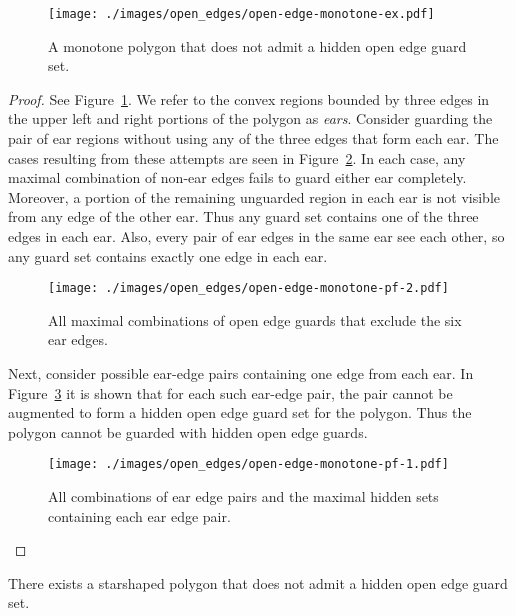 \documentclass{cccg12}
\begin{document}
\begin{figure}[ht]
\centering
\texttt{[image: ./images/open\_edges/open-edge-monotone-ex.pdf]}
\caption{A monotone polygon that does not admit a hidden open edge guard set.}
\label{fig:open-edge-monotone-ex}
\end{figure}

\begin{proof}
See Figure~\ref{fig:open-edge-monotone-ex}.
We refer to the convex regions bounded by three edges in the upper left and right portions of the polygon as \emph{ears}. 
Consider guarding the pair of ear regions without using any of the three edges that form each ear.
The cases resulting from these attempts are seen in Figure~\ref{fig:open-edge-monotone-pf-2}.
In each case, any maximal combination of non-ear edges fails to guard either ear completely.
Moreover, a portion of the remaining unguarded region in each ear is not visible from any edge of the other ear.
Thus any guard set contains one of the three edges in each ear.
Also, every pair of ear edges in the same ear see each other, so any guard set contains exactly one edge in each ear.

\begin{figure}[ht]
\centering
\texttt{[image: ./images/open\_edges/open-edge-monotone-pf-2.pdf]}
\caption{All maximal combinations of open edge guards that exclude the six ear edges.} 
\label{fig:open-edge-monotone-pf-2}
\end{figure}

Next, consider possible ear-edge pairs containing one edge from each ear.
In Figure~\ref{fig:open-edge-monotone-pf-1} it is shown that for each such ear-edge pair, the pair cannot be augmented to form a hidden open edge guard set for the polygon.
Thus the polygon cannot be guarded with hidden open edge guards. 

\begin{figure}[ht]
\centering
\texttt{[image: ./images/open\_edges/open-edge-monotone-pf-1.pdf]}
\caption{All combinations of ear edge pairs and the maximal hidden sets containing each ear edge pair.}
\label{fig:open-edge-monotone-pf-1}
\end{figure}

\end{proof}


\begin{lemma}
There exists a starshaped polygon that does not admit a hidden open edge guard set.
\end{lemma}
\end{document}
